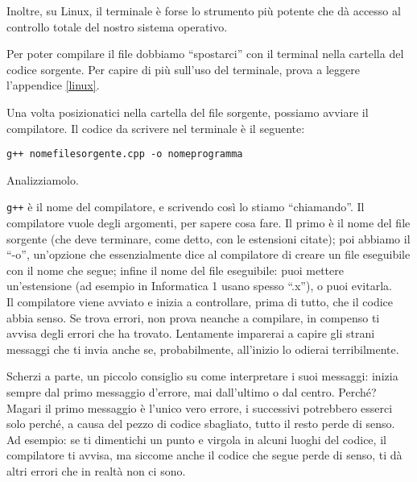 Inoltre, su Linux, il terminale è forse lo strumento più potente che dà accesso al controllo totale del nostro sistema operativo. 

Per poter compilare il file dobbiamo ``spostarci'' con il terminal nella cartella del codice sorgente. Per capire di più sull'uso del terminale, prova a leggere l'appendice \ref{linux}.

Una volta posizionatici nella cartella del file sorgente, possiamo avviare il compilatore. Il codice da scrivere nel terminale è il seguente: 
		\begin{shaded}
			\begin{minipage}{\textwidth}
				\begin{verbatim}
g++ nomefilesorgente.cpp -o nomeprogramma
				\end{verbatim}%
			\end{minipage}
		\end{shaded}
	Analizziamolo.
	
	\verb|g++| è il nome del compilatore, e scrivendo così lo stiamo ``chiamando''. Il compilatore vuole degli argomenti, per sapere cosa fare. Il primo è il nome del file sorgente (che deve terminare, come detto, con le estensioni citate); poi abbiamo il ``-o'', un'opzione che essenzialmente dice al compilatore di creare un file eseguibile con il nome che segue; infine il nome del file eseguibile: puoi mettere un'estensione (ad esempio in Informatica 1 usano spesso ``.x''), o puoi evitarla. 
	\\
	
	Il compilatore viene avviato e inizia a controllare, prima di tutto, che il codice abbia senso. Se trova errori, non prova neanche a compilare, in compenso ti avvisa degli errori che ha trovato. Lentamente imparerai a capire gli strani messaggi che ti invia anche se, probabilmente, all'inizio lo odierai terribilmente.
	
	Scherzi a parte, un piccolo consiglio su come interpretare i suoi messaggi: inizia sempre dal primo messaggio d'errore, mai dall'ultimo o dal centro. Perché? Magari il primo messaggio è l'unico vero errore, i successivi potrebbero esserci solo perché, a causa del pezzo di codice sbagliato, tutto il resto perde di senso. Ad esempio: se ti dimentichi un punto e virgola in alcuni luoghi del codice, il compilatore ti avvisa, ma siccome anche il codice che segue perde di senso, ti dà altri errori che in realtà non ci sono. 
	
